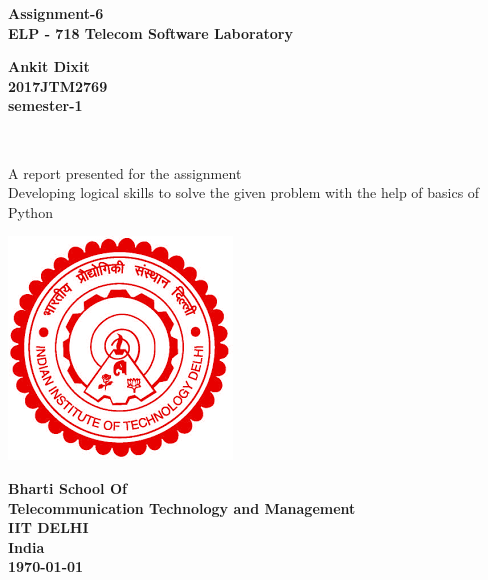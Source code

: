 \documentclass[12]{article}
\begin{document}
\begin{titlepage}
\begin{center}
\begin{Large}
\textbf{Assignment-6} \\
\medskip
\bigskip
\textbf{ELP - 718 Telecom Software Laboratory}\\
\end{Large}
\bigskip

\begin{large}
\textbf{Ankit Dixit}\\
\medskip
\textbf{2017JTM2769}\\
\medskip
\textbf{semester-1}
\end{large}
\bigskip
\bigskip\\
\begin{large}
A report presented for the assignment \\
\medskip
Developing logical skills to solve the given problem with the help of basics of Python\\
\end{large}

\vspace{3.5cm}
\includegraphics[scale=0.5]{logo} \\
\medskip
\bigskip
\bigskip
\begin{large}
\textbf{
Bharti School Of \\
\medskip
Telecommunication Technology and Management \\
\medskip
IIT DELHI\\
\smallskip
India\\
}
\bigskip
\textbf{\today}
\end{large}
\end{center}
\end{titlepage}





\newpage
\tableofcontents
\end{document}
